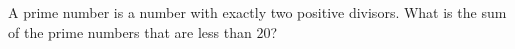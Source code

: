 A prime number is a number with exactly two positive divisors. What is the sum of the prime numbers that are less than $20$?
